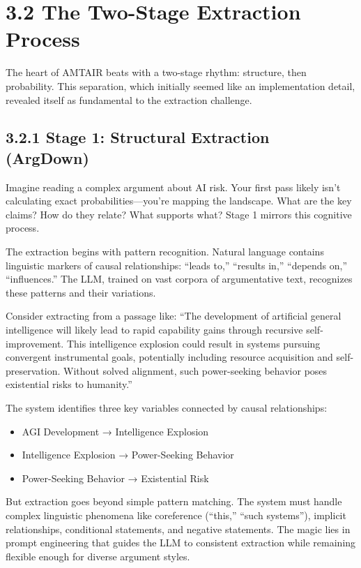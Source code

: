 \documentclass[
  11pt,
  letterpaper,
]{book}
\providecommand{\tightlist}{%
  \setlength{\itemsep}{0pt}\setlength{\parskip}{0pt}}
\begin{document}
\section{3.2 The Two-Stage Extraction
Process}\label{sec-two-stage-extraction}

The heart of AMTAIR beats with a two-stage rhythm: structure, then
probability. This separation, which initially seemed like an
implementation detail, revealed itself as fundamental to the extraction
challenge.

\subsection{3.2.1 Stage 1: Structural Extraction
(ArgDown)}\label{sec-stage1-argdown}

Imagine reading a complex argument about AI risk. Your first pass likely
isn't calculating exact probabilities---you're mapping the landscape.
What are the key claims? How do they relate? What supports what? Stage 1
mirrors this cognitive process.

The extraction begins with pattern recognition. Natural language
contains linguistic markers of causal relationships: ``leads to,''
``results in,'' ``depends on,'' ``influences.'' The LLM, trained on vast
corpora of argumentative text, recognizes these patterns and their
variations.

Consider extracting from a passage like: ``The development of artificial
general intelligence will likely lead to rapid capability gains through
recursive self-improvement. This intelligence explosion could result in
systems pursuing convergent instrumental goals, potentially including
resource acquisition and self-preservation. Without solved alignment,
such power-seeking behavior poses existential risks to humanity.''

The system identifies three key variables connected by causal
relationships:

\begin{itemize}
\tightlist
\item
  AGI Development → Intelligence Explosion
\item
  Intelligence Explosion → Power-Seeking Behavior
\item
  Power-Seeking Behavior → Existential Risk
\end{itemize}

But extraction goes beyond simple pattern matching. The system must
handle complex linguistic phenomena like coreference (``this,'' ``such
systems''), implicit relationships, conditional statements, and negative
statements. The magic lies in prompt engineering that guides the LLM to
consistent extraction while remaining flexible enough for diverse
argument styles.
\end{document}
